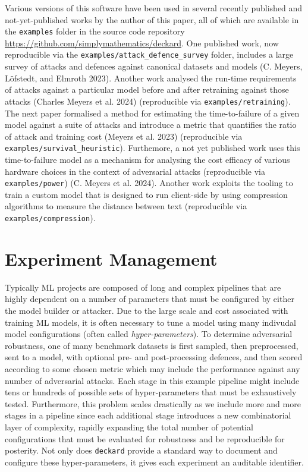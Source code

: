 \documentclass[
]{article}
\begin{document}
Various versions of this software have been used in several recently
published and not-yet-published works by the author of this paper, all
of which are available in the \texttt{examples} folder in the source
code repository \url{https://github.com/simplymathematics/deckard}. One
published work, now reproducible via the
\texttt{examples/attack\_defence\_survey} folder, includes a large
survey of attacks and defences against canonical datasets and models (C.
Meyers, Löfstedt, and Elmroth 2023). Another work analysed the run-time
requirements of attacks against a particular model before and after
retraining against those attacks (Charles Meyers et al. 2024)
(reproducible via \texttt{examples/retraining}). The next paper
formalised a method for estimating the time-to-failure of a given model
against a suite of attacks and introduce a metric that quantifies the
ratio of attack and training cost (Meyers et al. 2023) (reproducible via
\texttt{examples/survival\_heuristic}). Furthemore, a not yet published
work uses this time-to-failure model as a mechanism for analysing the
cost efficacy of various hardware choices in the context of adversarial
attacks (reproducible via \texttt{examples/power}) (C. Meyers et al.
2024). Another work exploits the tooling to train a custom model that is
designed to run client-side by using compression algorithms to measure
the distance between text (reproducible via
\texttt{examples/compression}).

\hypertarget{experiment-management}{%
\section{Experiment Management}\label{experiment-management}}

Typically ML projects are composed of long and complex pipelines that
are highly dependent on a number of parameters that must be configured
by either the model builder or attacker. Due to the large scale and cost
associated with training ML models, it is often necessary to tune a
model using many indivudal model configurations (often called
\emph{hyper-parameters}). To determine adversarial robustness, one of
many benchmark datasets is first sampled, then preprocessed, sent to a
model, with optional pre- and post-processing defences, and then scored
according to some chosen metric which may include the performance
against any number of adversarial attacks. Each stage in this example
pipeline might include tens or hundreds of possible sets of
hyper-parameters that must be exhaustively tested. Furthermore, this
problem scales drastically as we include more and more stages in a
pipeline since each additional stage introduces a new combinatorial
layer of complexity, rapidly expanding the total number of potential
configurations that must be evaluated for robustness and be reproducible
for posterity. Not only does \texttt{deckard} provide a standard way to
document and configure these hyper-parameters, it gives each experiment
an auditable identifier.
\end{document}
